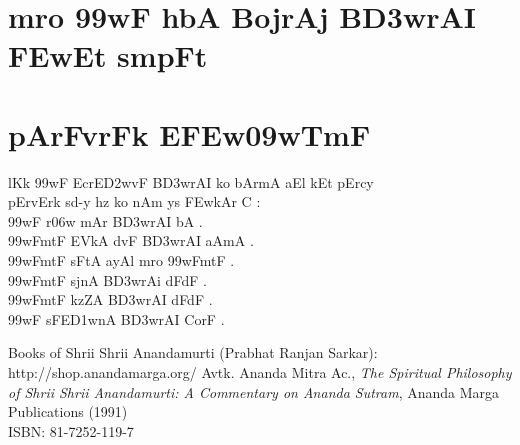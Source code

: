 \documentclass[12pt]{book}
\begin{document}
\frontmatter
%
\chapter*{\large {} }
\thispagestyle{empty}
\section*{\huge {}}
\newpage
%
\chapter*{\center \normalsize  {\dn m\?ro \399wF  h\0bA BojrAj B\3D3wrAI \3FEwEt smpF{\qvb}t}}
%
%
\mainmatter
%
\chapter{ {\dn pArFvrFk E\3FEw\309wTmF}}
 {\dn l\?Kk \399wF EcrE\3D2wvF B\3D3wrAI ko bAr\?mA aEl kEt pErcy\\
pErvErk sd-y hz ko nAm ys \3FEwkAr C {\rs :\re} \\
\399wF  r\?\306w mAr B\3D3wrAI bA .\\
\399wFmtF EVkA d\?vF B\3D3wrAI aAmA . \\
\399wFmtF sFtA ayA\0l m\?ro \399wFmtF . \\
\399wFmtF sjnA B\3D3wrAi dFdF . \\
\399wFmtF kzZA B\3D3wrAI dFdF . \\
\399wF sFE\3D1wnA B\3D3wrAI CorF . \\
}
%
\backmatter
%
\begin{thebibliography}{99}
Books of Shrii Shrii Anandamurti (Prabhat Ranjan Sarkar): \\
http://shop.anandamarga.org/
Avtk. Ananda Mitra Ac., \emph{The Spiritual Philosophy of Shrii Shrii Anandamurti: A Commentary on Ananda Sutram}, Ananda Marga Publications (1991) \\
ISBN: 81-7252-119-7
\end{thebibliography}
\end{document}
